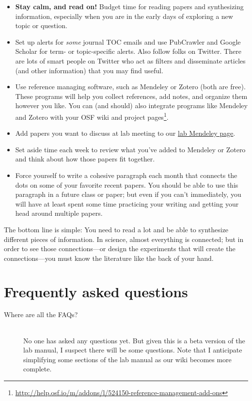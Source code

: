 \documentclass[letterpaper,12pt,oneside]{memoir}
\begin{document}
{\begin{itemize}
\item \textbf{Stay calm, and read on!} Budget time for reading papers and synthesizing information, especially when you are in the early days of exploring a new topic or question. 
\item Set up alerts for \textit{some} journal TOC emails and use PubCrawler and Google Scholar for term- or topic-specific alerts. Also follow folks on Twitter. There are lots of smart people on Twitter who act as filters and disseminate articles (and other information) that you may find useful.
\item Use reference managing software, such as Mendeley or Zotero (both are free). These programs will help you collect references, add notes, and organize them however you like. You can (and should) also integrate programs like Mendeley and Zotero with your OSF wiki and project pages\footnote{\url{http://help.osf.io/m/addons/l/524150-reference-management-add-ons}}.
\item Add papers you want to discuss at lab meeting to our \href{https://www.mendeley.com/community/smith-lab-meetings/}{lab Mendeley page}. 
\item Set aside time each week to review what you've added to Mendeley or Zotero and think about how those papers fit together.
\item Force yourself to write a cohesive paragraph each month that connects the dots on some of your favorite recent papers. You should be able to use this paragraph in a future class or paper; but even if you can't immediately, you will have at least spent some time practicing your writing and getting your head around multiple papers.
\end{itemize}

\begin{shaded}
\noindent The bottom line is simple: You need to read a lot and be able to synthesize different pieces of information. In science, almost everything is connected; but in order to see those connections---or design the experiments that will create the connections---you must know the literature like the back of your hand.
\end{shaded}


\chapter{Frequently asked questions}

\begin{description}
\item[Where are all the FAQs?] \hfill \\
No one has asked any questions yet. But given this is a beta version of the lab manual, I suspect there will be some questions. Note that I anticipate simplifying some sections of the lab manual as our wiki becomes more complete.



\end{description}}
\end{document}
